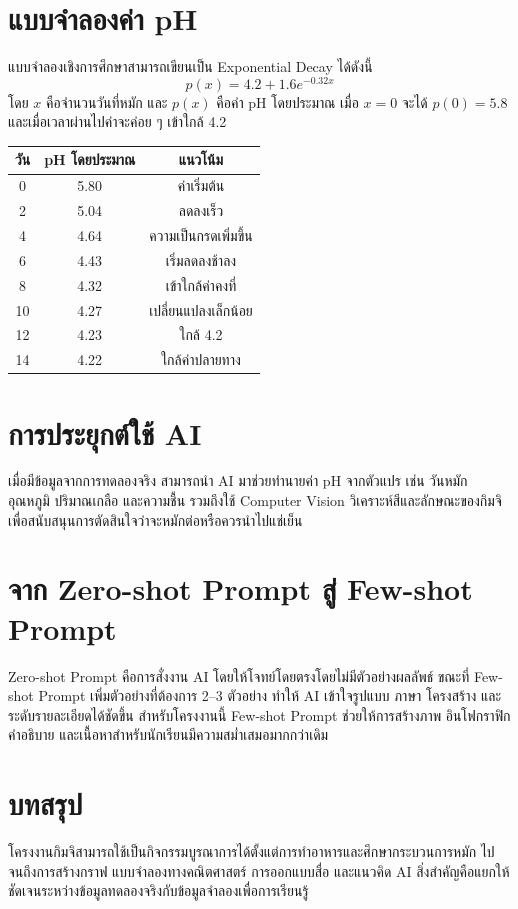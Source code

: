 \documentclass[12pt,a4paper]{article}
\begin{document}
\section{แบบจำลองค่า pH}
แบบจำลองเชิงการศึกษาสามารถเขียนเป็น Exponential Decay ได้ดังนี้
\[
\boxed{p(x)=4.2+1.6e^{-0.32x}}
\]
โดย $x$ คือจำนวนวันที่หมัก และ $p(x)$ คือค่า pH โดยประมาณ เมื่อ $x=0$ จะได้ $p(0)=5.8$ และเมื่อเวลาผ่านไปค่าจะค่อย ๆ เข้าใกล้ 4.2

\begin{center}
\begin{tabular}{ccc}
\toprule
วัน & pH โดยประมาณ & แนวโน้ม\\
\midrule
0 & 5.80 & ค่าเริ่มต้น\\
2 & 5.04 & ลดลงเร็ว\\
4 & 4.64 & ความเป็นกรดเพิ่มขึ้น\\
6 & 4.43 & เริ่มลดลงช้าลง\\
8 & 4.32 & เข้าใกล้ค่าคงที่\\
10 & 4.27 & เปลี่ยนแปลงเล็กน้อย\\
12 & 4.23 & ใกล้ 4.2\\
14 & 4.22 & ใกล้ค่าปลายทาง\\
\bottomrule
\end{tabular}
\end{center}

\section{การประยุกต์ใช้ AI}
เมื่อมีข้อมูลจากการทดลองจริง สามารถนำ AI มาช่วยทำนายค่า pH จากตัวแปร เช่น วันหมัก อุณหภูมิ ปริมาณเกลือ และความชื้น รวมถึงใช้ Computer Vision วิเคราะห์สีและลักษณะของกิมจิ เพื่อสนับสนุนการตัดสินใจว่าจะหมักต่อหรือควรนำไปแช่เย็น

\section{จาก Zero-shot Prompt สู่ Few-shot Prompt}
Zero-shot Prompt คือการสั่งงาน AI โดยให้โจทย์โดยตรงโดยไม่มีตัวอย่างผลลัพธ์ ขณะที่ Few-shot Prompt เพิ่มตัวอย่างที่ต้องการ 2--3 ตัวอย่าง ทำให้ AI เข้าใจรูปแบบ ภาษา โครงสร้าง และระดับรายละเอียดได้ชัดขึ้น สำหรับโครงงานนี้ Few-shot Prompt ช่วยให้การสร้างภาพ อินโฟกราฟิก คำอธิบาย และเนื้อหาสำหรับนักเรียนมีความสม่ำเสมอมากกว่าเดิม

\section{บทสรุป}
โครงงานกิมจิสามารถใช้เป็นกิจกรรมบูรณาการได้ตั้งแต่การทำอาหารและศึกษากระบวนการหมัก ไปจนถึงการสร้างกราฟ แบบจำลองทางคณิตศาสตร์ การออกแบบสื่อ และแนวคิด AI สิ่งสำคัญคือแยกให้ชัดเจนระหว่างข้อมูลทดลองจริงกับข้อมูลจำลองเพื่อการเรียนรู้
\end{document}
